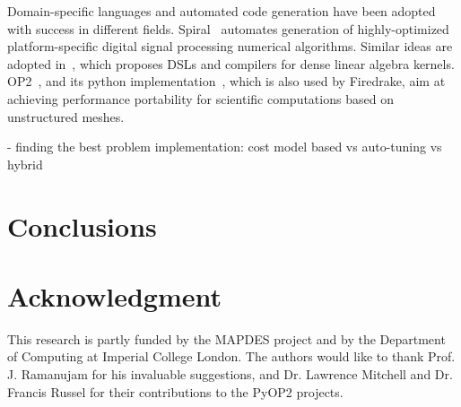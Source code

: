 \documentclass[conference]{IEEEtran}
\begin{document}
Domain-specific languages and automated code generation have been adopted with success in different fields. Spiral~\cite{Pueschel:05} automates generation of highly-optimized platform-specific digital signal processing numerical algorithms. Similar ideas are adopted in~\cite{Spampinato:14}, which proposes DSLs and compilers for dense linear algebra kernels. OP2~\cite{op2-main}, and its python implementation~\cite{pyop2isc}, which is also used by Firedrake, aim at achieving performance portability for scientific computations based on unstructured meshes. 

- finding the best problem implementation: cost model based vs auto-tuning vs hybrid




\section{Conclusions}
\label{sec:conclusions}




\section*{Acknowledgment}

This research is partly funded by the MAPDES project and by the Department of Computing at Imperial College London. The authors would like to thank Prof. J. Ramanujam for his invaluable suggestions, and Dr. Lawrence Mitchell and Dr. Francis Russel for their contributions to the PyOP2 projects.





\end{document}
